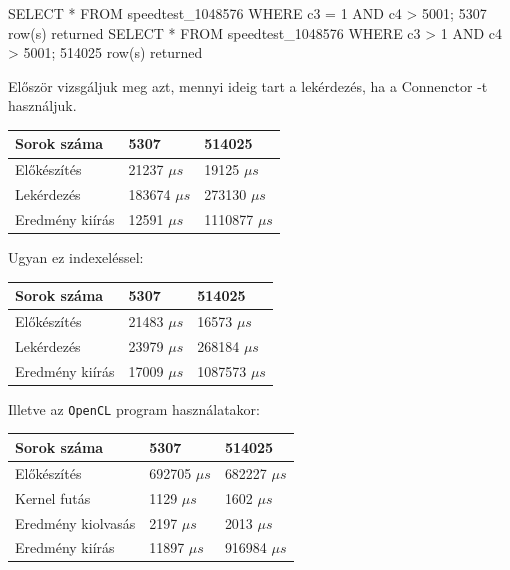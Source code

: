 \begin{python}
SELECT * FROM speedtest_1048576 WHERE c3 = 1 AND c4 > 5001;
	5307 row(s) returned
SELECT * FROM speedtest_1048576 WHERE c3 > 1 AND c4 > 5001;
	514025 row(s) returned
\end{python}
Először vizsgáljuk meg azt, mennyi ideig tart a lekérdezés, ha a Connenctor -t használjuk.

\begin{table}[h!]
\centering
\begin{tabular}{|p{6cm}|p{3cm}|p{3cm}|}
\hline
Sorok száma & 5307 & 514025 \\
\hline\hline

Előkészítés & 21237 $\mu s$ & 19125 $\mu s$ \\
\hline

Lekérdezés & 183674 $\mu s$ & 273130 $\mu s$ \\
\hline

Eredmény kiírás & 12591 $\mu s$ & 1110877 $\mu s$ \\
\hline
\end{tabular}
\end{table}
Ugyan ez indexeléssel:
\begin{table}[h!]
\centering
\begin{tabular}{|p{6cm}|p{3cm}|p{3cm}|}
\hline
Sorok száma & 5307 & 514025 \\
\hline
\hline

Előkészítés & 21483 $\mu s$ & 16573 $\mu s$ \\
\hline

Lekérdezés & 23979 $\mu s$ & 268184 $\mu s$ \\
\hline

Eredmény kiírás & 17009 $\mu s$ & 1087573 $\mu s$ \\
\hline
\end{tabular}
\end{table}

Illetve az \texttt{OpenCL} program használatakor:
\begin{table}[h!]
\centering
\begin{tabular}{|p{6cm}|p{3cm}|p{3cm}|}
\hline
Sorok száma & 5307 & 514025 \\
\hline
\hline
Előkészítés & 692705 $\mu s$ & 682227 $\mu s$ \\
\hline
Kernel futás & 1129 $\mu s$ & 1602 $\mu s$ \\
\hline
Eredmény kiolvasás & 2197 $\mu s$ & 2013 $\mu s$ \\
\hline
Eredmény kiírás & 11897 $\mu s$ & 916984 $\mu s$ \\
\hline

\end{tabular}
\end{table}

